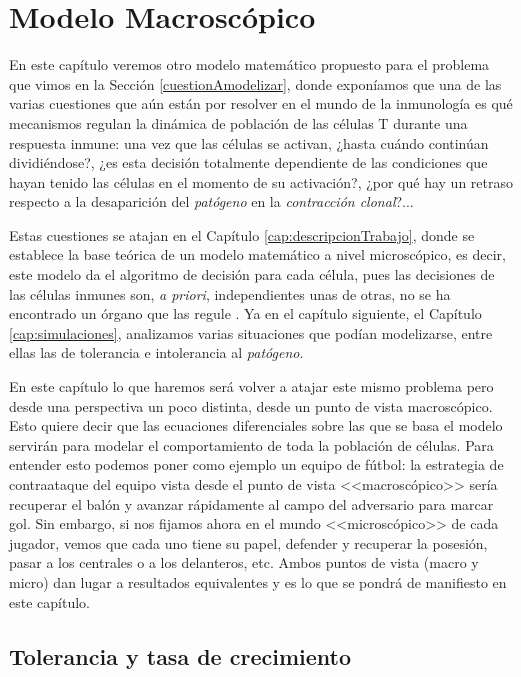 
\chapter{Modelo Macroscópico}
\label{cap:modeloMacroscopico}

En este capítulo veremos otro modelo matemático propuesto para el problema que vimos en la Sección \ref{cuestionAmodelizar}, donde exponíamos que una de las varias cuestiones que aún están por resolver en el mundo de la inmunología es qué mecanismos regulan la dinámica de población de las células T durante una respuesta inmune: una vez que las células se activan, ¿hasta cuándo continúan dividiéndose?, ¿es esta decisión totalmente dependiente de las condiciones que hayan tenido las células en el momento de su activación?, ¿por qué hay un retraso respecto a la desaparición del \textit{patógeno} en la \textit{contracción clonal}?... 

Estas cuestiones se atajan en el Capítulo \ref{cap:descripcionTrabajo}, donde se establece la base teórica de un modelo matemático a nivel microscópico, es decir, este modelo da el algoritmo de decisión para cada célula, pues las decisiones de las células inmunes son, \textit{a priori}, independientes unas de otras, no se ha encontrado un órgano que las regule \citep{arias2016emergent}. Ya en el capítulo siguiente, el Capítulo \ref{cap:simulaciones}, analizamos varias situaciones que podían modelizarse, entre ellas las de tolerancia e intolerancia al \textit{patógeno}.

En este capítulo lo que haremos será volver a atajar este mismo problema pero desde una perspectiva un poco distinta, desde un punto de vista macroscópico. Esto quiere decir que las ecuaciones diferenciales sobre las que se basa el modelo servirán para modelar el comportamiento de toda la población de células. Para entender esto podemos poner como ejemplo un equipo de fútbol: la estrategia de contraataque del equipo vista desde el punto de vista <<macroscópico>> sería recuperar el balón y avanzar rápidamente al campo del adversario para marcar gol. Sin embargo, si nos fijamos ahora en el mundo <<microscópico>> de cada jugador, vemos que cada uno tiene su papel, defender y recuperar la posesión, pasar a los centrales o a los delanteros, etc. Ambos puntos de vista (macro y micro) dan lugar a resultados equivalentes y es lo que se pondrá de manifiesto en este capítulo.

\section{Tolerancia y tasa de crecimiento}

